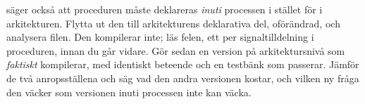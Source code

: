   säger också att proceduren måste deklareras \emph{inuti} processen
i stället för i arkitekturen. Flytta ut den till arkitekturens deklarativa del, oförändrad, och
analysera filen. Den kompilerar inte; läs felen, ett per signaltilldelning i proceduren, innan du går
vidare. Gör sedan en version på arkitektursnivå som \emph{faktiskt} kompilerar, med identiskt
beteende och en testbänk som passerar. Jämför de två anropsställena och säg vad den andra versionen
kostar, och vilken ny fråga den väcker som versionen inuti processen inte kan väcka.

